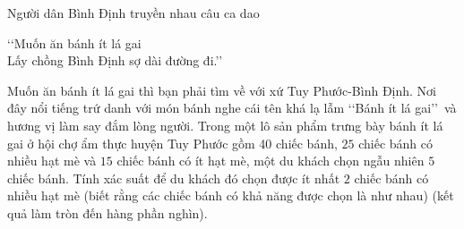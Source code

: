 \begin{ex}%
Người dân Bình Định truyền nhau câu ca dao
\begin{center}
\lq\lq Muốn ăn bánh ít lá gai\\
Lấy chồng Bình Định sợ dài đường đi.\rq\rq
\end{center}
Muốn ăn bánh ít lá gai thì bạn phải tìm về với xứ Tuy Phước-Bình Định. Nơi đây nổi tiếng trứ danh với món bánh nghe cái tên khá lạ lẫm \lq\lq Bánh ít lá gai\rq\rq\, và hương vị làm say đắm lòng người. Trong một lô sản phẩm trưng bày bánh ít lá gai ở hội chợ ẩm thực huyện Tuy Phước gồm 40 chiếc bánh, $25$ chiếc bánh có nhiều hạt mè và $15$ chiếc bánh có ít hạt mè, một du khách chọn ngẫu nhiên $5$ chiếc bánh. Tính xác suất để du khách đó chọn được ít nhất $2$ chiếc bánh có nhiều hạt mè (biết rằng các chiếc bánh có khả năng được chọn là như nhau) (kết quả làm tròn đến hàng phần nghìn).
\end{ex}

